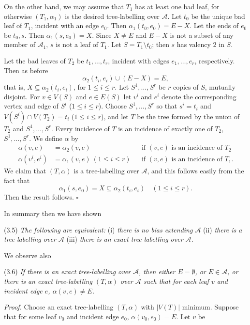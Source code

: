 On the other hand, we may assume that $T_1$ has at least one bad leaf, for otherwise $(T_1, \alpha_1)$ is the desired tree-labelling over $\mathscr{A}$. Let $t_0$ be the unique bad leaf of $T_1$, incident with an edge $e_0$. Then $\alpha_1(t_0, e_0) = E - X$. Let the ends of $e_0$ be $t_0, s$. Then $\alpha_1(s, e_0) = X$. Since $X \ne E$ and $E - X$ is not a subset of any member of $\mathscr{A}_1$, $s$ is not a leaf of $T_1$. Let $S = T_1 \setminus t_0$; then $s$ has valency 2 in $S$.

Let the bad leaves of $T_2$ be $t_1, \dots, t_r$, incident with edges $e_1, \dots, e_r$, respectively. Then as before
\begin{equation*}
\alpha_2(t_i, e_i) \cup (E - X) = E,
\end{equation*}
that is, $X \subseteq \alpha_2(t_i, e_i)$, for $1 \le i \le r$. Let $S^1, \dots, S^r$ be $r$ copies of $S$, mutually disjoint. For $v \in V(S)$ and $e \in E(S)$ let $v^i$ and $e^i$ denote the corresponding vertex and edge of $S^i$ ($1 \le i \le r$). Choose $S^1, \dots, S^r$ so that $s^i = t_i$ and $V(S^i) \cap V(T_2) = t_i$ ($1 \le i \le r$), and let $T$ be the tree formed by the union of $T_2$ and $S^1, \dots, S^r$. Every incidence of $T$ is an incidence of exactly one of $T_2$, $S^1, \dots, S^r$. We define $\alpha$ by
\begin{align*}
\alpha(v, e) &= \alpha_2(v, e) && \text{if } (v, e) \text{ is an incidence of } T_2 \\
\alpha(v^i, e^i) &= \alpha_1(v, e) \ (1 \le i \le r) && \text{if } (v, e) \text{ is an incidence of } T_1.
\end{align*}
We claim that $(T, \alpha)$ is a tree-labelling over $\mathscr{A}$, and this follows easily from the fact that
\begin{equation*}
\alpha_1(s, e_0) = X \subseteq \alpha_2(t_i, e_i) \quad (1 \le i \le r).
\end{equation*}
Then the result follows. $\square$

In summary then we have shown

\stmt
(3.5) \textit{The following are equivalent:} (i) \textit{there is no bias extending $\mathscr{A}$} (ii) \textit{there is a tree-labelling over $\mathscr{A}$} (iii) \textit{there is an exact tree-labelling over $\mathscr{A}$.}

We observe also

\stmt
(3.6) \textit{If there is an exact tree-labelling over $\mathscr{A}$, then either $E = \emptyset$, or $E \in \mathscr{A}$, or there is an exact tree-labelling $(T, \alpha)$ over $\mathscr{A}$ such that for each leaf $v$ and incident edge $e$, $\alpha(v, e) \ne E$.}

\textit{Proof.} Choose an exact tree-labelling $(T, \alpha)$ with $|V(T)|$ minimum. Suppose that for some leaf $v_0$ and incident edge $e_0$, $\alpha(v_0, e_0) = E$. Let $v$ be
